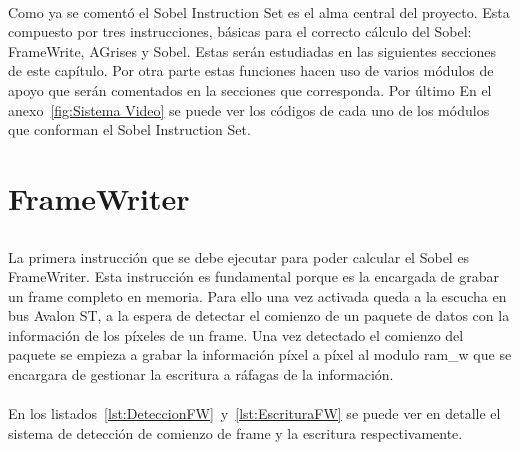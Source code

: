 \documentclass[a4paper,12pt,titlepage,final]{book}
\begin{document}
\paragraph{}
Como ya se comentó el Sobel Instruction Set es el alma central del proyecto. Esta compuesto por tres instrucciones, básicas para el correcto cálculo del Sobel: FrameWrite, AGrises y Sobel. Estas serán estudiadas en las siguientes secciones de este capítulo. Por otra parte estas funciones hacen uso de varios módulos de apoyo que serán comentados en la secciones que corresponda. Por último En el anexo~\ref{fig:Sistema Video} se puede ver los códigos de cada uno de los módulos que conforman el Sobel Instruction Set.

\section{FrameWriter}
\subsection*{}
\subsubsection*{}

\paragraph{}
La primera instrucción que se debe ejecutar para poder calcular el Sobel es FrameWriter. Esta instrucción es fundamental porque es la encargada de grabar un frame completo en memoria. Para ello una vez activada queda a la escucha en bus Avalon ST, a la espera de detectar el comienzo de un paquete de datos con la información de los píxeles de un frame. Una vez detectado el comienzo del paquete se empieza a grabar la información píxel a píxel al modulo ram\_w que se encargara de gestionar la escritura a ráfagas de la información.

\paragraph{}
En los listados~\ref{lst:DeteccionFW}~y~\ref{lst:EscrituraFW} se puede ver en detalle el sistema de detección de comienzo de frame y la escritura respectivamente. 


\end{document}
